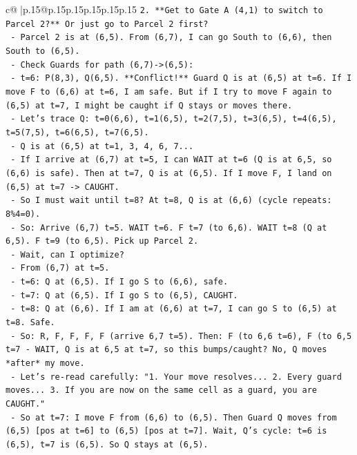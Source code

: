 \documentclass{article}
\begin{document}
{\begin{supertabular}{c@{$\;$}|p{.15\linewidth}@{}p{.15\linewidth}p{.15\linewidth}p{.15\linewidth}p{.15\linewidth}p{.15\linewidth}}
{{{\texttt{2.  **Get to Gate A (4,1) to switch to Parcel 2?** Or just go to Parcel 2 first?} \\
\texttt{    {-} Parcel 2 is at (6,5). From (6,7), I can go South to (6,6), then South to (6,5).} \\
\texttt{    {-} Check Guards for path (6,7){-}>(6,5):} \\
\texttt{        {-} t=6: P(8,3), Q(6,5). **Conflict!** Guard Q is at (6,5) at t=6. If I move F to (6,6) at t=6, I am safe. But if I try to move F again to (6,5) at t=7, I might be caught if Q stays or moves there.} \\
\texttt{        {-} Let's trace Q: t=0(6,6), t=1(6,5), t=2(7,5), t=3(6,5), t=4(6,5), t=5(7,5), t=6(6,5), t=7(6,5).} \\
\texttt{        {-} Q is at (6,5) at t=1, 3, 4, 6, 7...} \\
\texttt{        {-} If I arrive at (6,7) at t=5, I can WAIT at t=6 (Q is at 6,5, so (6,6) is safe). Then at t=7, Q is at (6,5). If I move F, I land on (6,5) at t=7 {-}> CAUGHT.} \\
\texttt{        {-} So I must wait until t=8? At t=8, Q is at (6,6) (cycle repeats: 8\%4=0).} \\
\texttt{        {-} So: Arrive (6,7) t=5. WAIT t=6. F t=7 (to 6,6). WAIT t=8 (Q at 6,5). F t=9 (to 6,5). Pick up Parcel 2.} \\
\texttt{        {-} Wait, can I optimize?} \\
\texttt{        {-} From (6,7) at t=5.} \\
\texttt{        {-} t=6: Q at (6,5). If I go S to (6,6), safe.} \\
\texttt{        {-} t=7: Q at (6,5). If I go S to (6,5), CAUGHT.} \\
\texttt{        {-} t=8: Q at (6,6). If I am at (6,6) at t=7, I can go S to (6,5) at t=8. Safe.} \\
\texttt{        {-} So: R, F, F, F, F (arrive 6,7 t=5). Then: F (to 6,6 t=6), F (to 6,5 t=7 {-} WAIT, Q is at 6,5 at t=7, so this bumps/caught? No, Q moves *after* my move.} \\
\texttt{        {-} Let's re{-}read carefully: "1. Your move resolves... 2. Every guard moves... 3. If you are now on the same cell as a guard, you are CAUGHT."} \\
\texttt{        {-} So at t=7: I move F from (6,6) to (6,5). Then Guard Q moves from (6,5) {[}pos at t=6{]} to (6,5) {[}pos at t=7{]}. Wait, Q's cycle: t=6 is (6,5), t=7 is (6,5). So Q stays at (6,5).} \\
}}}
\end{supertabular}}
\end{document}
